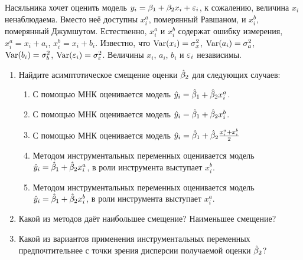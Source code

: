 \begin{problem}
Насяльника хочет оценить модель $y_i=\beta_1+\beta_2 x_i +\varepsilon_i$, к сожалению, величина $x_i$ ненаблюдаема. Вместо неё доступны  $x_i^a$, померянный Равшаном, и $x_i^b$, померянный Джумшутом. Естественно, $x_i^a$ и $x_i^b$ содержат ошибку измерения, $x_i^a=x_i+a_i$, $x_i^b=x_i+b_i$. Известно, что $\operatorname{Var}(x_i)=\sigma^2_x$, $\operatorname{Var}(a_i)=\sigma^2_a$,  $\operatorname{Var}(b_i)=\sigma^2_b$,  $\operatorname{Var}(\varepsilon_i)=\sigma^2_{\varepsilon}$. Величины $x_i$, $a_i$, $b_i$ и $\varepsilon_i$ независимы.

\begin{enumerate}
\item Найдите асимптотическое смещение оценки $\hat{\beta}_2$ для следующих случаев:
\begin{enumerate}
\item С помощью МНК оценивается модель $\hat{y}_i=\hat{\beta}_1+\hat{\beta}_2 x_i^a$.
\item С помощью МНК оценивается модель $\hat{y}_i=\hat{\beta}_1+\hat{\beta}_2 x_i^b$.
\item С помощью МНК оценивается модель $\hat{y}_i=\hat{\beta}_1+\hat{\beta}_2 \frac{x_i^a+x_i^b}{2}$
\item Методом инструментальных переменных оценивается модель $\hat{y}_i=\hat{\beta}_1+\hat{\beta}_2 x_i^a$, в роли инструмента выступает $x_i^b$.
\item Методом инструментальных переменных оценивается модель $\hat{y}_i=\hat{\beta}_1+\hat{\beta}_2 x_i^b$, в роли инструмента выступает $x_i^a$.
\end{enumerate}
\item Какой из методов даёт наибольшее смещение? Наименьшее смещение?
\item Какой из вариантов применения инструментальных переменных предпочтительнее с точки зрения дисперсии получаемой оценки $\hat{\beta}_2$?
\end{enumerate}

\begin{sol}
\end{sol}
\end{problem}


